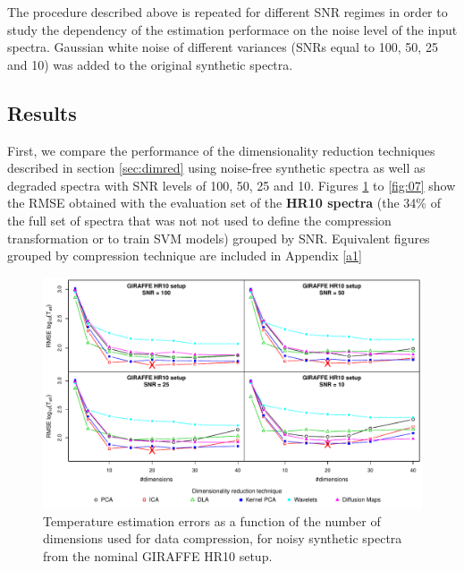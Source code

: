 \documentclass[a4paper,fleqn,usenatbib]{mnras}
\begin{document}
{{{The procedure described above is repeated for different SNR regimes in
order to study the dependency of the estimation performace on the
noise level of the input spectra. Gaussian white noise of different
variances (SNRs equal to 100, 50, 25 and 10) was added to the original
synthetic spectra. 

\subsection{Results}

First, we compare the performance of the dimensionality reduction
techniques described in section \ref{sec:dimred} using noise-free
synthetic spectra as well as degraded spectra with SNR levels of 100,
50, 25 and 10. Figures \ref{fig:02} to \ref{fig:07} show the RMSE
obtained with the evaluation set of the {\bf HR10 spectra} (the 34\% 
of the full set of spectra that was not not used to define the 
compression transformation or to train SVM models) grouped by SNR. 
Equivalent figures grouped by compression technique are included in 
Appendix \ref{a1} 

\begin{figure}
\centering\includegraphics[width=\textwidth]{flamesHR10_Teff_log_BestSVM_N-RMSE_test.pdf}
\caption{Temperature estimation errors as a function of the number of
  dimensions used for data compression, for noisy synthetic
  spectra from the nominal GIRAFFE HR10 setup.}
\label{fig:02}
\end{figure}

}}}
\end{document}
